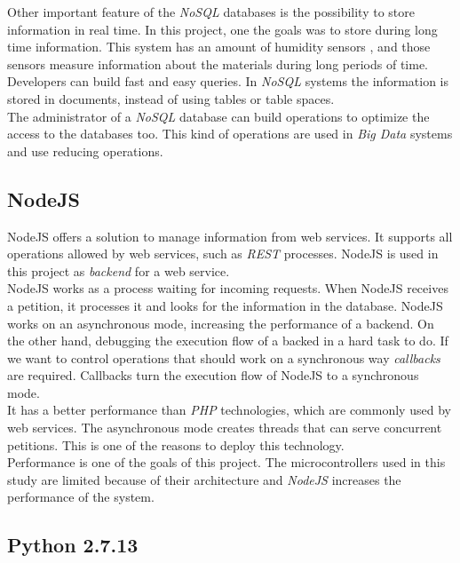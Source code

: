 Other important feature of the \textit{NoSQL} databases is the possibility to store information in real time. In this project, one the goals was to store during long time information. This system has an amount of humidity sensors \cite{humidity_system}, and those sensors measure information about the materials during long periods of time.\\

Developers can build fast and easy queries. In \textit{NoSQL} systems the information is stored in documents, instead of using tables or table spaces.\\

The administrator of a \textit{NoSQL} database can build operations to optimize the access to the databases too. This kind of operations are used in \textit{Big Data} systems and use reducing operations.

\subsection{NodeJS}

NodeJS \cite{node_js, node_js_introduction} offers a solution to manage information from web services. It supports all operations allowed by web services, such as \textit{REST} processes. NodeJS is used in this project as \textit{backend} for a web service.\\

NodeJS works as a process waiting for incoming requests. When NodeJS receives a petition, it processes it and looks for the information in the database. NodeJS works on an asynchronous mode, increasing the performance of a backend. On the other hand, debugging the execution flow of a backed in a hard task to do. If we want to control operations that should work on a synchronous way \textit{callbacks} are required. Callbacks turn the execution flow of NodeJS to a synchronous mode.\\

It has a better performance than \textit{PHP} technologies, which are commonly used by web services. The asynchronous mode creates threads that can serve concurrent petitions. This is one of the reasons to deploy this technology.\\

Performance is one of the goals of this project. The microcontrollers used in this study are limited because of their architecture and \textit{NodeJS} increases the performance of the system.

\subsection{Python 2.7.13}

